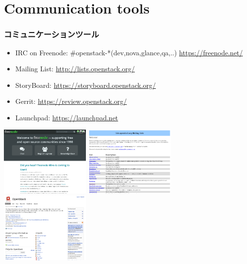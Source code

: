\documentclass[aspectratio=169,11pt,hyperref={colorlinks=true}]{beamer}
\begin{document}
\section{Communication tools}
\begin{frame}
  \frametitle{コミュニケーションツール}
  \begin{itemize}
    \item IRC on Freenode: \#openstack-*(dev,nova,glance,qa,..) \url{https://freenode.net/}
    \item Mailing List: \url{http://lists.openstack.org/}
    \item StoryBoard: \url{https://storyboard.openstack.org/}
    \item Gerrit: \url{https://review.openstack.org/}
    \item Launchpad: \url{https://launchpad.net}
  \end{itemize}
  \centering
  \includegraphics[height=35mm]{images/freenode.png}
  \includegraphics[height=35mm]{images/openstack-ml.png}
  \includegraphics[height=35mm]{images/openstack-in-launchpad.png}
\end{frame}
\end{document}
